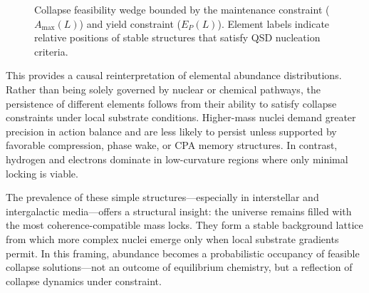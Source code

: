 \documentclass[preprints,article,submit,pdftex,moreauthors]{Definitions/mdpi}
\begin{document}
\begin{figure}[h!]
\centering
{}
\caption{Collapse feasibility wedge bounded by the maintenance constraint ($A_{\max}(L)$) and yield constraint ($E_P(L)$). Element labels indicate relative positions of stable structures that satisfy QSD nucleation criteria.}
\label{fig:feasibility_wedge}
\end{figure}


This provides a causal reinterpretation of elemental abundance distributions. Rather than being solely governed by nuclear or chemical pathways, the persistence of different elements follows from their ability to satisfy collapse constraints under local substrate conditions. Higher-mass nuclei demand greater precision in action balance and are less likely to persist unless supported by favorable compression, phase wake, or CPA memory structures. In contrast, hydrogen and electrons dominate in low-curvature regions where only minimal locking is viable.

The prevalence of these simple structures—especially in interstellar and intergalactic media—offers a structural insight: the universe remains filled with the most coherence-compatible mass locks. They form a stable background lattice from which more complex nuclei emerge only when local substrate gradients permit. In this framing, abundance becomes a probabilistic occupancy of feasible collapse solutions—not an outcome of equilibrium chemistry, but a reflection of collapse dynamics under constraint.
\end{document}
